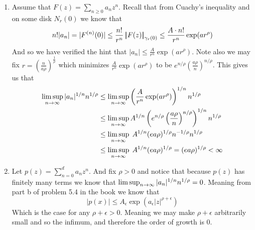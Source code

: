 \documentclass[12pt]{amsart}
\begin{document}
\begin{enumerate}
    \item Assume that $F(z)=\sum_{n\geq 0} a_nz^n$. Recall that from Cuachy's inequality and on some disk $N_r(0)$ we know that
    $$n!|a_n|=|F^{(n)}(0)| \leq \frac{n!}{r^n}\norm{F(z)}_{\gamma_r(0)} 
    \leq \frac{A\cdot n!}{r^n}\exp(ar^\rho)$$
    And so we have verified the hint that $|a_n|\leq \frac{A}{r^n}\exp(ar^\rho)$.
    Note also we may fix $r=\left(\frac{n}{a\rho}\right)^{\frac{1}{\rho}}$ which minimizes $\frac{A}{r^n}\exp(ar^\rho)$ to be $e^{n/\rho}\left(\frac{a\rho}{n}\right)^{n/\rho}$. This gives us that
    \begin{align*}
    \limsup_{n\rightarrow\infty}|a_n|^{1/n}n^{1/\rho}&\leq \limsup_{n\rightarrow\infty}\left(\frac{A}{r^n}\exp(ar^\rho)\right)^{1/n}n^{1/\rho}\\
    &\leq \limsup_{n\rightarrow\infty}A^{1/n}\left(e^{n/\rho}\left(\frac{a\rho}{n}\right)^{n/\rho}\right)^{1/n}n^{1/\rho}\\
    &\leq \limsup_{n\rightarrow\infty}\;A^{1/n} (ea\rho)^{1/\rho}n^{-1/\rho}n^{1/\rho}\\
    &\leq \limsup_{n\rightarrow\infty}\;A^{1/n}(ea\rho)^{1/\rho}=(ea\rho)^{1/\rho}<\infty\\
    \end{align*}


\item Let $p(z)=\sum_{n= 0}^d a_nz^n$. And fix $\rho>0$ and notice that because $p(z)$ has finitely many terms we know that $\limsup_{n\rightarrow \infty}{|a_n|^{1/n}n^{1/\rho}}=0$. Meaning from part b of problem 5.4 in the book we know that 
$$|p(x)|\leq A_\epsilon \exp(a_\epsilon|z|^{\rho+\epsilon})$$
Which is the case for any $\rho+\epsilon>0$. Meaning we may make $\rho+\epsilon$ arbitrarily small and so the infimum, and therefore the order of growth is $0$.
\end{enumerate}
\end{document}
